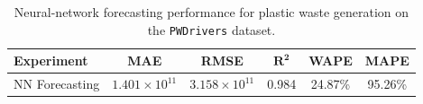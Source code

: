\begin{table}[!ht]
	\centering
	\caption{\centering Neural-network forecasting performance for plastic waste generation on the \texttt{PWDrivers} dataset.}
	\begin{tabular}{@{}lccccc@{}}
		\toprule
		\textbf{Experiment} & \textbf{MAE}           & \textbf{RMSE}          & $\mathbf{R^2}$ & \textbf{WAPE} & \textbf{MAPE} \\
		\midrule
		NN Forecasting      & \(1.401 \times 10^11\) & \(3.158 \times 10^11\) & 0.984          & 24.87\%       & 95.26\%       \\
		\hline
	\end{tabular}
	\label{tab:nn_forecasting_metrics}
\end{table}
